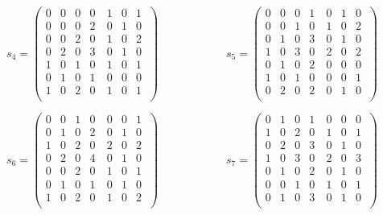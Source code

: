 \documentclass[a4paper,11pt]{article}
\begin{document}
{$$
s_4 = \left( \begin{array}{ccccccc}
   0 & 0 & 0 & 0 & 1 & 0 & 1 \\ 0 & 0 & 0 & 2 & 0 & 1 & 0 \\ 0 & 0 & 2 & 0 \
& 1 & 0 & 2 \\ 0 & 2 & 0 & 3 & 0 & 1 & 0 \\ 1 & 0 & 1 & 0 & 1 & 0 & 1 \
\\ 0 & 1 & 0 & 1 & 0 & 0 & 0 \\ 1 & 0 & 2 & 0 & 1 & 0 & 1 \\
\end{array}
\right)
\qquad \qquad \qquad
s_5= \left( \begin{array}{ccccccc}
   0 & 0 & 0 & 1 & 0 & 1 & 0 \\ 0 & 0 & 1 & 0 & 1 & 0 & 2 \\ 0 & 1 & 0 & 3 \
& 0 & 1 & 0 \\ 1 & 0 & 3 & 0 & 2 & 0 & 2 \\ 0 & 1 & 0 & 2 & 0 & 0 & 0 \
\\ 1 & 0 & 1 & 0 & 0 & 0 & 1 \\ 0 & 2 & 0 & 2 & 0 & 1 & 0 \\
\end{array}
\right)
$$

$$
s_6 = \left( \begin{array}{ccccccc}
   0 & 0 & 1 & 0 & 0 & 0 & 1 \\ 0 & 1 & 0 & 2 & 0 & 1 & 0 \\ 1 & 0 & 2 & 0 \
& 2 & 0 & 2 \\ 0 & 2 & 0 & 4 & 0 & 1 & 0 \\ 0 & 0 & 2 & 0 & 1 & 0 & 1 \
\\ 0 & 1 & 0 & 1 & 0 & 1 & 0 \\ 1 & 0 & 2 & 0 & 1 & 0 & 2 \\
\end{array}
\right)
\qquad \qquad \qquad
s_7 = \left( \begin{array}{ccccccc}
   0 & 1 & 0 & 1 & 0 & 0 & 0 \\ 1 & 0 & 2 & 0 & 1 & 0 & 1 \\ 0 & 2 & 0 & 3 \
& 0 & 1 & 0 \\ 1 & 0 & 3 & 0 & 2 & 0 & 3 \\ 0 & 1 & 0 & 2 & 0 & 1 & 0 \
\\ 0 & 0 & 1 & 0 & 1 & 0 & 1 \\ 0 & 1 & 0 & 3 & 0 & 1 & 0 \\
\end{array}
\right)
$$

}
\end{document}
